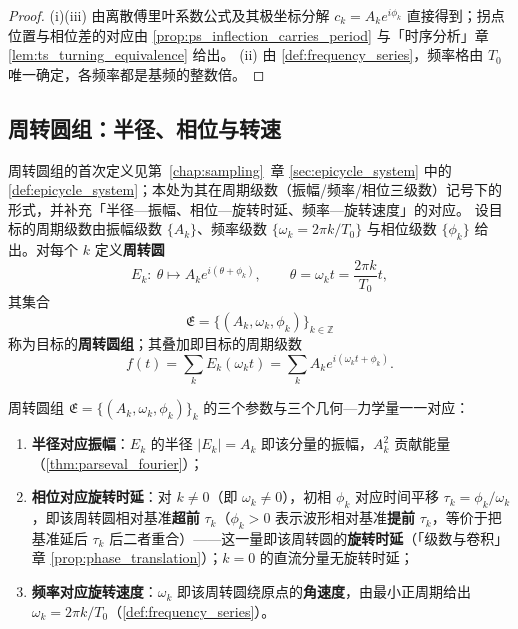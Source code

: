 \begin{proof}
(i)(iii) 由离散傅里叶系数公式及其极坐标分解 $c_k=A_ke^{i\phi_k}$ 直接得到；拐点位置与相位差的对应由 \cref{prop:ps_inflection_carries_period} 与「时序分析」章 \cref{lem:ts_turning_equivalence} 给出。
(ii) 由 \cref{def:frequency_series}，频率格由 $T_0$ 唯一确定，各频率都是基频的整数倍。
\end{proof}

\subsection{周转圆组：半径、相位与转速}

\begin{definition}[周转圆组]\label{def:ps_epicycle_group}
周转圆组的首次定义见第~\ref{chap:sampling}~章 \cref{sec:epicycle_system} 中的 \cref{def:epicycle_system}；本处为其在周期级数（振幅/频率/相位三级数）记号下的形式，并补充「半径—振幅、相位—旋转时延、频率—旋转速度」的对应。
设目标的周期级数由振幅级数 $\{A_k\}$、频率级数 $\{\omega_k=2\pi k/T_0\}$ 与相位级数 $\{\phi_k\}$ 给出。对每个 $k$ 定义\textbf{周转圆}
\[
E_k:\ \theta\mapsto A_ke^{i(\theta+\phi_k)},\qquad \theta=\omega_kt=\frac{2\pi k}{T_0}t,
\]
其集合
\[
\mathfrak{E}=\{(A_k,\omega_k,\phi_k)\}_{k\in\mathbb{Z}}
\]
称为目标的\textbf{周转圆组}；其叠加即目标的周期级数
\[
f(t)=\sum_kE_k(\omega_kt)=\sum_kA_ke^{i(\omega_kt+\phi_k)}.
\]
\end{definition}

\begin{proposition}\label{prop:ps_epicycle_correspondence}
周转圆组 $\mathfrak{E}=\{(A_k,\omega_k,\phi_k)\}_{k}$ 的三个参数与三个几何—力学量一一对应：
\begin{enumerate}[label=(\roman*)]
    \item \textbf{半径对应振幅}：$E_k$ 的半径 $|E_k|=A_k$ 即该分量的振幅，$A_k^2$ 贡献能量（\cref{thm:parseval_fourier}）；
    \item \textbf{相位对应旋转时延}：对 $k\ne0$（即 $\omega_k\ne0$），初相 $\phi_k$ 对应时间平移 $\tau_k=\phi_k/\omega_k$，即该周转圆相对基准\textbf{超前} $\tau_k$（$\phi_k>0$ 表示波形相对基准\textbf{提前} $\tau_k$，等价于把基准延后 $\tau_k$ 后二者重合）——这一量即该周转圆的\textbf{旋转时延}（「级数与卷积」章 \cref{prop:phase_translation}）；$k=0$ 的直流分量无旋转时延；
    \item \textbf{频率对应旋转速度}：$\omega_k$ 即该周转圆绕原点的\textbf{角速度}，由最小正周期给出 $\omega_k=2\pi k/T_0$（\cref{def:frequency_series}）。
\end{enumerate}
\end{proposition}

